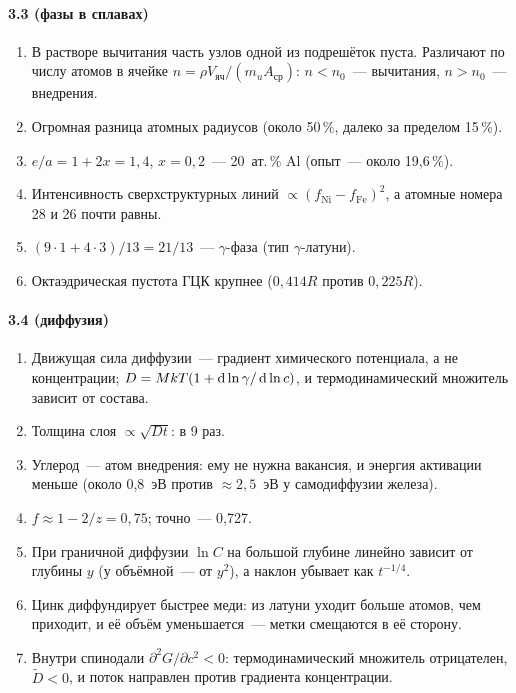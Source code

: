 {\paragraph{3.3 (фазы в сплавах)}
\begin{enumerate}[label=\arabic*.]
\item В растворе вычитания часть узлов одной из подрешёток пуста.
Различают по числу атомов в ячейке $n=\rho V_\text{яч}/(m_uA_\text{ср})$:
$n<n_0$~— вычитания, $n>n_0$~— внедрения.
\item Огромная разница атомных радиусов (около 50\,\%, далеко за пределом
15\,\%).
\item $e/a=1+2x=1{,}4$, $x=0{,}2$~— 20~ат.\,\% Al (опыт~— около 19,6\,\%).
\item Интенсивность сверхструктурных линий $\propto(f_\text{Ni}-f_\text{Fe})^2$, а
атомные номера 28 и 26 почти равны.
\item $(9\cdot1+4\cdot3)/13=21/13$~— $\gamma$-фаза (тип $\gamma$-латуни).
\item Октаэдрическая пустота ГЦК крупнее ($0{,}414R$ против $0{,}225R$).
\end{enumerate}

\paragraph{3.4 (диффузия)}
\begin{enumerate}[label=\arabic*.]
\item Движущая сила диффузии~— градиент химического потенциала, а не
концентрации; $D=MkT(1+\mathop{}\!\mathrm{d}\ln\gamma/\mathop{}\!\mathrm{d}\ln c)$, и термодинамический множитель
зависит от состава.
\item Толщина слоя $\propto\sqrt{Dt}$: в 9 раз.
\item Углерод~— атом внедрения: ему не нужна вакансия, и энергия
активации меньше (около 0,8~эВ против ${\approx}2{,}5$~эВ у самодиффузии
железа).
\item $f\approx1-2/z=0{,}75$; точно~— 0,727.
\item При граничной диффузии $\ln C$ на большой глубине линейно зависит от
глубины $y$ (у объёмной~— от $y^2$), а наклон убывает как $t^{-1/4}$.
\item Цинк диффундирует быстрее меди: из латуни уходит больше атомов, чем
приходит, и её объём уменьшается~— метки смещаются в её сторону.
\item Внутри спинодали $\partial^2G/\partial c^2<0$: термодинамический
множитель отрицателен, $\tilde D<0$, и поток направлен против градиента
концентрации.
\end{enumerate}

}
